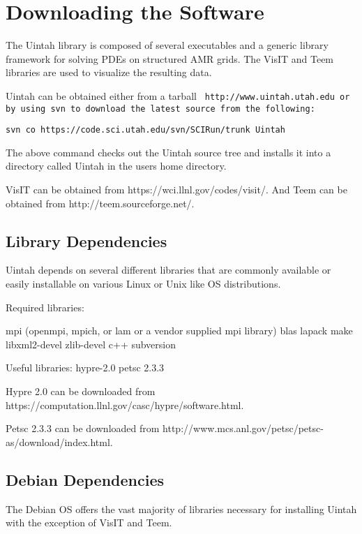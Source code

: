 \section{Downloading the Software} \label{Sec:download}

The Uintah library is composed of several executables and a generic
library framework for solving PDEs on structured AMR grids.  The VisIT
and Teem libraries are used to visualize the resulting data.

Uintah can be obtained either from a tarball \tt
http://www.uintah.utah.edu \normalfont or by using svn to download the
latest source from the following:

\begin{Verbatim}[fontsize=\footnotesize]
  svn co https://code.sci.utah.edu/svn/SCIRun/trunk Uintah
\end{Verbatim}

The above command checks out the Uintah source tree and installs it
into a directory called Uintah in the users home directory.

VisIT can be obtained from https://wci.llnl.gov/codes/visit/. And Teem
can be obtained from http://teem.sourceforge.net/.


\subsection{Library Dependencies}

Uintah depends on several different libraries that are commonly
available or easily installable on various Linux or Unix like OS
distributions.  

Required libraries:

mpi (openmpi, mpich, or lam or a vendor supplied mpi library)
blas
lapack
make
libxml2-devel
zlib-devel
c++
subversion

Useful libraries:
hypre-2.0
petsc 2.3.3

Hypre 2.0 can be downloaded from
https://computation.llnl.gov/casc/hypre/software.html.

Petsc 2.3.3 can be downloaded from
http://www.mcs.anl.gov/petsc/petsc-as/download/index.html.


\subsection{Debian Dependencies}

The Debian OS offers the vast majority of libraries necessary for
installing Uintah with the exception of VisIT and Teem.

